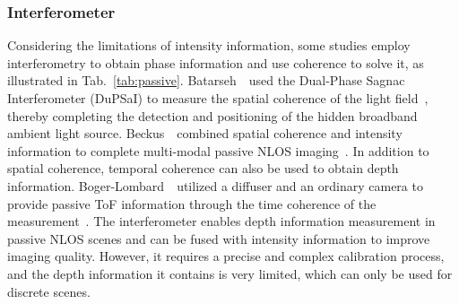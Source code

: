 \subsubsection{Interferometer}
Considering the limitations of intensity information, some studies employ interferometry to obtain phase information and use coherence to solve it, as illustrated in Tab.~\ref{tab:passive}. 
Batarseh~\etal~used the Dual-Phase Sagnac Interferometer (DuPSaI) to measure the spatial coherence of the light field~\cite{batarsehPassiveSensingCorner2018a}, thereby completing the detection and positioning of the hidden broadband ambient light source. Beckus~\etal~combined spatial coherence and intensity information to complete multi-modal passive NLOS imaging~\cite{beckusMultiModalNonLineofSightPassive2019}. In addition to spatial coherence, temporal coherence can also be used to obtain depth information. Boger-Lombard~\etal~utilized a diffuser and an ordinary camera to provide passive ToF information through the time coherence of the measurement~\cite{boger-lombardPassiveOpticalTimeofflight2019}. 
The interferometer enables depth information measurement in passive NLOS scenes and can be fused with intensity information to improve imaging quality. However, it requires a precise and complex calibration process, and the depth information it contains is very limited, which can only be used for discrete scenes.

